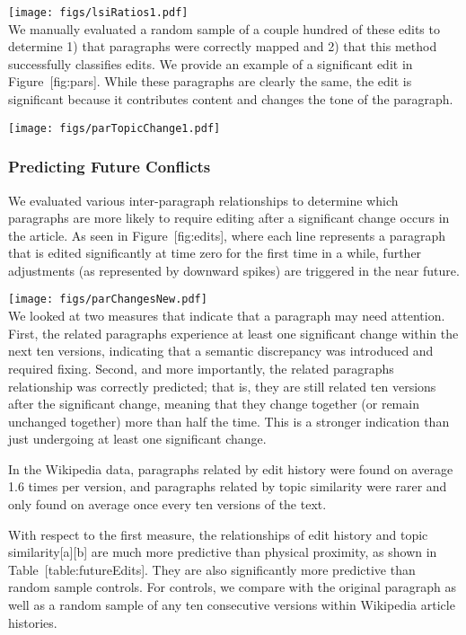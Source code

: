 \texttt{[image: figs/lsiRatios1.pdf]}\\

We manually evaluated a random sample of a couple hundred of these edits
to determine 1) that paragraphs were correctly mapped and 2) that this
method successfully classifies edits. We provide an example of a
significant edit in Figure~{[}fig:pars{]}. While these paragraphs are
clearly the same, the edit is significant because it contributes content
and changes the tone of the paragraph.

\texttt{[image: figs/parTopicChange1.pdf]}\\

\subsubsection{Predicting Future
Conflicts}\label{predicting-future-conflicts}

We evaluated various inter-paragraph relationships to determine which
paragraphs are more likely to require editing after a significant change
occurs in the article. As seen in Figure~{[}fig:edits{]}, where each
line represents a paragraph that is edited significantly at time zero
for the first time in a while, further adjustments (as represented by
downward spikes) are triggered in the near future.

\texttt{[image: figs/parChangesNew.pdf]}\\

We looked at two measures that indicate that a paragraph may need
attention. First, the related paragraphs experience at least one
significant change within the next ten versions, indicating that a
semantic discrepancy was introduced and required fixing. Second, and
more importantly, the related paragraphs relationship was correctly
predicted; that is, they are still related ten versions after the
significant change, meaning that they change together (or remain
unchanged together) more than half the time. This is a stronger
indication than just undergoing at least one significant change.

In the Wikipedia data, paragraphs related by edit history were found on
average 1.6 times per version, and paragraphs related by topic
similarity were rarer and only found on average once every ten versions
of the text.

With respect to the first measure, the relationships of edit history and
topic similarity{[}a{]}{[}b{]} are much more predictive than physical
proximity, as shown in Table~{[}table:futureEdits{]}. They are also
significantly more predictive than random sample controls. For controls,
we compare with the original paragraph as well as a random sample of any
ten consecutive versions within Wikipedia article histories.

